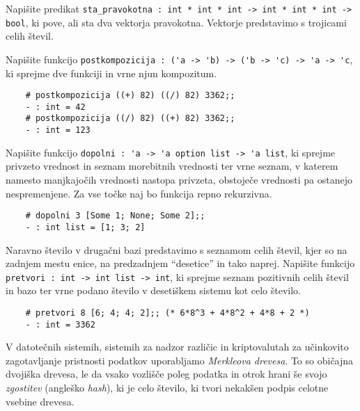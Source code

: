\documentclass[arhiv]{../izpit}
\begin{document}
	


\naloga

\podnaloga
  Napišite predikat \verb|sta_pravokotna : int * int * int -> int * int * int -> bool|, ki pove, ali sta dva vektorja pravokotna. Vektorje predstavimo s trojicami celih števil.

\podnaloga
  Napišite funkcijo \verb|postkompozicija : ('a -> 'b) -> ('b -> 'c) -> 'a -> 'c|, ki sprejme dve funkciji in vrne njun kompozitum.
  \begin{verbatim}
    # postkompozicija ((+) 82) ((/) 82) 3362;;
    - : int = 42
    # postkompozicija ((/) 82) ((+) 82) 3362;;
    - : int = 123
  \end{verbatim}

\podnaloga
  Napišite funkcijo \verb|dopolni : 'a -> 'a option list -> 'a list|, ki sprejme privzeto vrednost in seznam morebitnih vrednosti ter vrne seznam, v katerem namesto manjkajočih vrednosti nastopa privzeta, obstoječe vrednosti pa ostanejo nespremenjene. Za vse točke naj bo funkcija repno rekurzivna.
  \begin{verbatim}
    # dopolni 3 [Some 1; None; Some 2];;
    - : int list = [1; 3; 2]
  \end{verbatim}

\podnaloga
  Naravno število v drugačni bazi predstavimo s seznamom celih števil, kjer so na zadnjem mestu enice, na predzadnjem ``desetice'' in tako naprej. Napišite funkcijo \verb|pretvori : int -> int list -> int|, ki sprejme seznam pozitivnih celih števil in bazo ter vrne podano število v desetiškem sistemu kot celo število.
  \begin{verbatim}
    # pretvori 8 [6; 4; 4; 2];; (* 6*8^3 + 4*8^2 + 4*8 + 2 *)
    - : int = 3362
  \end{verbatim}


\naloga

V datotečnih sistemih, sistemih za nadzor različic in kriptovalutah za učinkovito zagotavljanje pristnosti podatkov uporabljamo \emph{Merkleova drevesa}. To so običajna dvojiška drevesa, le da vsako vozlišče poleg podatka in otrok hrani še svojo \emph{zgostitev} (angleško \emph{hash}), ki je celo število, ki tvori nekakšen podpis celotne vsebine drevesa.
\end{document}
